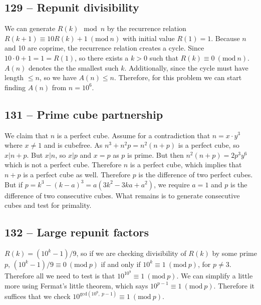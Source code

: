 \documentclass{article}
\newcommand{\Mod}[1]{\ (\mathrm{mod}\ #1)}
\begin{document}
\subsection*{129 -- Repunit divisibility} 
We can generate $R(k) \mod n$ by the recurrence relation $R(k+1) \equiv 10R(k) + 1 \Mod{n}$ with initial value $R(1) = 1$. 
Because $n$ and 10 are coprime, the recurrence relation creates a cycle. 
Since $10\cdot0 + 1 = 1 = R(1)$, so there exists a $k > 0$ such that $R(k) \equiv 0 \Mod{n}$. 
$A(n)$ denotes the the smallest such $k$. 
Additionally, since the cycle must have length $\leq n$, so we have $A(n) \leq n$. 
Therefore, for this problem we can start finding $A(n)$ from $n=10^6$. 

\subsection*{131 -- Prime cube partnership} 
We claim that $n$ is a perfect cube. 
Assume for a contradiction that $n = x \cdot y^3$ where $x \neq 1$ and is cubefree. 
As $n^3 + n^2p = n^2(n+p)$ is a perfect cube, so $x | n+p$. 
But $x|n$, so $x|p$ and $x=p$ as $p$ is prime. 
But then $n^2(n+p) = 2p^3y^6$ which is not a perfect cube. 
Therefore $n$ is a perfect cube, which implies that $n+p$ is a perfect cube as well. 
Therefore $p$ is the difference of two perfect cubes. 
But if $p = k^3 - (k-a)^3 = a(3k^2 - 3ka + a^2)$, we require $a=1$ and $p$ is the difference of two consecutive cubes. 
What remains is to generate consecutive cubes and test for primality.

\subsection*{132 -- Large repunit factors} 
$R(k) = (10^k-1)/9$, so if we are checking divisibility of $R(k)$ by some prime $p$, $(10^k-1)/9 \equiv 0 \Mod{p}$ if and only if  $10^k \equiv 1 \Mod{p}$,  for $p \neq 3$. 
Therefore all we need to test is that $10^{10^9} \equiv 1 \Mod{p}$.
We can simplify a little more using Fermat's little theorem, which says $10^{p-1} \equiv 1 \Mod{p}$.
Therefore it suffices that we check $10^{\text{gcd}(10^9,\:p-1)} \equiv 1 \Mod{p}$.
\end{document}

